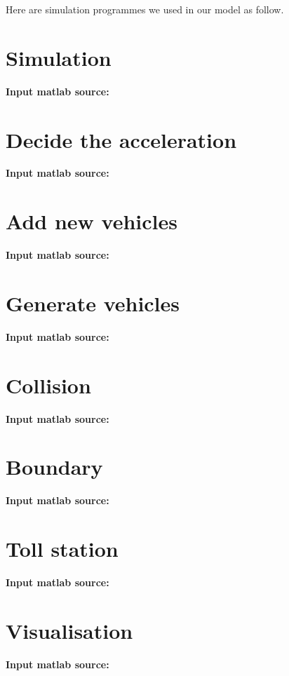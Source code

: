 \documentclass{mcmthesis}
\begin{document}
\begin{appendices}
	Here are simulation programmes we used in our model as follow.\\
\section{Simulation}
\textbf{\textcolor[rgb]{0.98,0.00,0.00}{Input matlab source:}}


\section{Decide the acceleration}
\textbf{\textcolor[rgb]{0.98,0.00,0.00}{Input matlab source:}}


\section{Add new vehicles}
\textbf{\textcolor[rgb]{0.98,0.00,0.00}{Input matlab source:}}


\section{Generate vehicles}
\textbf{\textcolor[rgb]{0.98,0.00,0.00}{Input matlab source:}}


\section{Collision}
\textbf{\textcolor[rgb]{0.98,0.00,0.00}{Input matlab source:}}


\section{Boundary}
\textbf{\textcolor[rgb]{0.98,0.00,0.00}{Input matlab source:}}


\section{Toll station}
\textbf{\textcolor[rgb]{0.98,0.00,0.00}{Input matlab source:}}


\section{Visualisation}
\textbf{\textcolor[rgb]{0.98,0.00,0.00}{Input matlab source:}}


\end{appendices}


\nocite{*}



	
\end{document}
